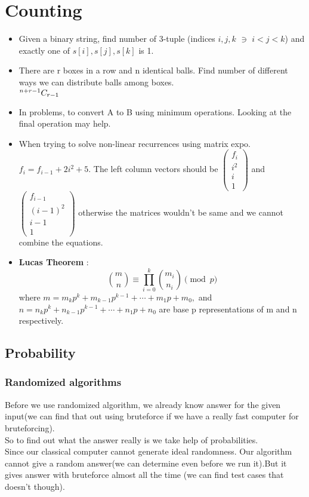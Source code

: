 \documentclass[../Notes.tex]{subfiles}
\begin{document}
\chapter{Counting}

\begin{itemize}
	\item Given a binary string, find number of 3-tuple (indices $i,j,k$ $\ni$ $i<j<k$) and exactly one of $s[i],s[j],s[k]$ is 1. 
	\item There are r boxes in a row and n identical balls. Find number of different ways we can distribute balls among boxes.\\
	${}^{n+r-1}C_{r-1}$
	\item In problems, to convert A to B using minimum operations. Looking at the final operation may help.
	\item When trying to solve non-linear recurrences using matrix expo.
	$f_i = f_{i - 1} + 2i^2 + 5$. The left column vectors should be
	$\begin{pmatrix} f_i\\ i^2\\ i\\ 1\end{pmatrix}$ and $\begin{pmatrix} f_{i-1}\\ (i-1)^2\\ i-1\\ 1\end{pmatrix}$ otherwise the matrices wouldn't be same and we cannot combine the equations.
	\item \textbf{Lucas Theorem} : $${\binom {m}{n}}\equiv \prod _{i=0}^{k}{\binom {m_{i}}{n_{i}}}{\pmod {p}}$$
	where $m=m_{k}p^{k}+m_{k-1}p^{k-1}+\cdots +m_{1}p+m_{0},$ and\\ 
	$n=n_{k}p^{k}+n_{k-1}p^{k-1}+\cdots +n_{1}p+n_{0}$ are base p representations of m and n respectively.
\end{itemize}
\section{Probability}
\subsection{Randomized algorithms}
Before we use randomized algorithm, we already know answer for the given input(we can find that out using bruteforce if we have a really fast computer for bruteforcing).\\
So to find out what the answer really is we take help of probabilities.\\
Since our classical computer cannot generate ideal randomness. Our algorithm cannot give a random answer(we can determine even before we run it).But it gives answer with bruteforce almost all the time (we can find test cases that doesn't though).
\end{document}
